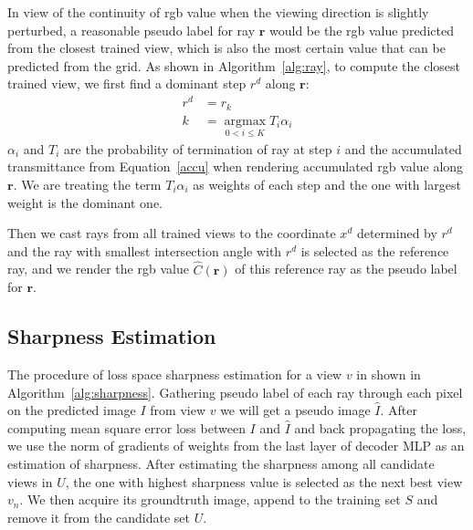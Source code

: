 In view of the continuity of rgb value when the viewing direction is slightly perturbed, a reasonable pseudo label for ray $\bm{r}$ would be the rgb value predicted from the closest trained view, which is also the most certain value that can be predicted from the grid.
As shown in Algorithm~\ref{alg:ray}, to compute the closest trained view, we first find a dominant step $r^d$ along $\bm{r}$:
\begin{equation}
    \begin{aligned}
        r^d &= r_k \\
        k & =\mathop{\arg\max}\limits_{0<i \leq K} T_i \alpha_i
    \end{aligned}
\end{equation}
$\alpha_i$ and $T_i$ are the probability of termination of ray at step $i$ and the accumulated transmittance from Equation~\ref{accu} when rendering accumulated rgb value along $\bm{r}$.
We are treating the term $T_i \alpha_i$ as weights of each step and the one with largest weight is the dominant one.

Then we cast rays from all trained views to the coordinate $x^d$ determined by $r^d$ and the ray with smallest intersection angle with $r^d$ is selected as the reference ray, and we render the rgb value $\hat{C}(\bm{r})$ of this reference ray as the pseudo label for $\bm{r}$.

\subsection{Sharpness Estimation}
The procedure of loss space sharpness estimation for a view $v$ in shown in Algorithm~\ref{alg:sharpness}.
Gathering pseudo label of each ray through each pixel on the predicted image $I$ from view $v$ we will get a pseudo image $\hat{I}$. 
After computing mean square error loss between $I$ and $\hat{I}$ and back propagating the loss, we use the norm of gradients of weights from the last layer of decoder MLP as an estimation of sharpness.
After estimating the sharpness among all candidate views in $U$, the one with highest sharpness value is selected as the next best view $v_n$.
We then acquire its groundtruth image, append to the training set $S$ and remove it from the candidate set $U$.

